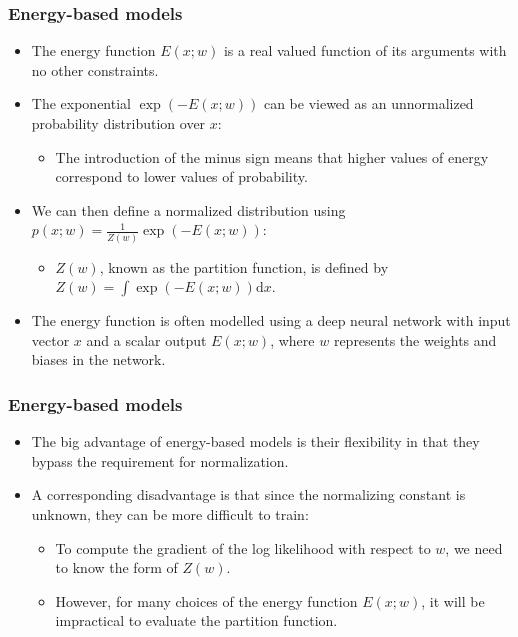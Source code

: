 \documentclass{beamer}
\begin{document}
\begin{frame}
    \frametitle{Energy-based models}
    \begin{itemize}
        \item The energy function $E(x;w)$ is a real valued function of its arguments with no other constraints.
        \item The exponential $\exp(-E(x;w))$ can be viewed as an unnormalized probability distribution over $x$:
        \begin{itemize}
            \item The introduction of the minus sign means that higher values of energy correspond to lower values of probability.
        \end{itemize}
        \item We can then define a normalized distribution using $p(x;w)=\frac{1}{Z(w)}\exp(-E(x;w))$:
        \begin{itemize}
            \item $Z(w)$, known as the partition function, is defined by $Z(w)=\int\exp(-E(x;w))\mathrm{d}x$.
        \end{itemize}
        \item The energy function is often modelled using a deep neural network with input vector $x$ and a scalar output $E(x;w)$, where $w$ represents the weights and biases in the network.
    \end{itemize}
\end{frame}

\begin{frame}
    \frametitle{Energy-based models}
    \begin{itemize}
        \item The big advantage of energy-based models is their flexibility in that they bypass the requirement for normalization.
        \item A corresponding disadvantage is that since the normalizing constant is unknown, they can be more difficult to train:
        \begin{itemize}
            \item To compute the gradient of the log likelihood with respect to $w$, we need to know the form of $Z(w)$.
            \item However, for many choices of the energy function $E(x;w)$, it will be impractical to evaluate the partition function.
        \end{itemize}
    \end{itemize}
\end{frame}
\end{document}
